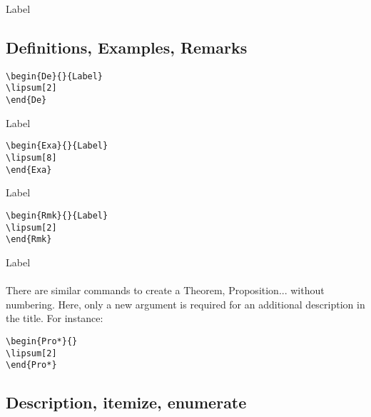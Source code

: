 \begin{Co}{}{Label}
\lipsum[2]
\end{Co}
\subsection{Definitions, Examples, Remarks}
\begin{verbatim}
\begin{De}{}{Label}
\lipsum[2]
\end{De}
\end{verbatim}

\begin{De}{}{Label}
\lipsum[2]
\end{De}
\begin{verbatim}
\begin{Exa}{}{Label}
\lipsum[8]
\end{Exa}
\end{verbatim}

\begin{Exa}{}{Label}
\lipsum[8]
\end{Exa}
\begin{verbatim}
\begin{Rmk}{}{Label}
\lipsum[2]
\end{Rmk}
\end{verbatim}

\begin{Rmk}{}{Label}
\lipsum[2]
\end{Rmk}
\paragraph*{}
There are similar commands to create a Theorem, Proposition... without numbering. Here, only a new argument is required for an additional description in the title. For instance:

\begin{verbatim}
\begin{Pro*}{}
\lipsum[2]
\end{Pro*}
\end{verbatim}

\begin{Pro*}{}
\lipsum[2]
\end{Pro*}



\subsection{Description, itemize, enumerate}
